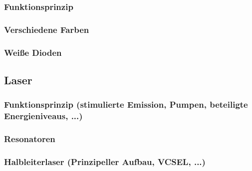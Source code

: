 	\subsubsection{Funktionsprinzip}
	\subsubsection{Verschiedene Farben}
	\subsubsection{Weiße Dioden}
\subsection{Laser}
	\subsubsection{Funktionsprinzip (stimulierte Emission, Pumpen, beteiligte Energieniveaus, ...)}
	
	\subsubsection{Resonatoren}
	\subsubsection{Halbleiterlaser (Prinzipeller Aufbau, VCSEL, ...)}


